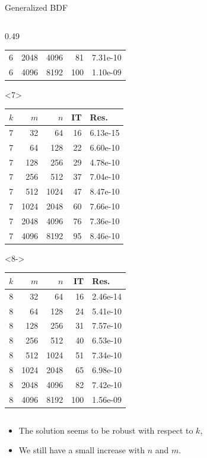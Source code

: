 \documentclass[aspectratio=169,xcolor=dvipsnames]{beamer}
\begin{document}
\begin{frame}[fragile]{Generalized BDF}
\begin{columns}
\begin{column}{0.49\columnwidth}
\begin{onlyenv}
\begin{tabular}{crrrl}
6 & 2048 & 4096 & 81 & 7.31e-10\\
6 & 4096 & 8192 & 100 & 1.10e-09\\
		\bottomrule
	\end{tabular}
\end{onlyenv}
\begin{onlyenv}<7>
	\begin{tabular}{crrrl}
		\toprule
		$k$ & $m$ & $n$ & IT & Res. \\
		\midrule
7 & 32 & 64 & 16 & 6.13e-15\\
7 & 64 & 128 & 22 & 6.60e-10\\
7 & 128 & 256 & 29 & 4.78e-10\\
7 & 256 & 512 & 37 & 7.04e-10\\
7 & 512 & 1024 & 47 & 8.47e-10\\
7 & 1024 & 2048 & 60 & 7.66e-10\\
7 & 2048 & 4096 & 76 & 7.36e-10\\
7 & 4096 & 8192 & 95 & 8.46e-10\\
		\bottomrule
	\end{tabular}
\end{onlyenv}
\begin{onlyenv}<8->
	\begin{tabular}{crrrl}
		\toprule
		$k$ & $m$ & $n$ & IT & Res. \\
		\midrule
8 & 32 & 64 & 16 & 2.46e-14\\
8 & 64 & 128 & 24 & 5.41e-10\\
8 & 128 & 256 & 31 & 7.57e-10\\
8 & 256 & 512 & 40 & 6.53e-10\\
8 & 512 & 1024 & 51 & 7.34e-10\\
8 & 1024 & 2048 & 65 & 6.98e-10\\
8 & 2048 & 4096 & 82 & 7.42e-10\\
8 & 4096 & 8192 & 100 & 1.56e-09\\
		\bottomrule
	\end{tabular}
\end{onlyenv}
\end{column}
\end{columns}
\vfill

\begin{itemize}
	\item[\faEye]<9-> The solution seems to be robust with respect to $k$,
	\item[\faEye]<10-> We still have a small increase with $n$ and $m$.
\end{itemize}
\end{frame}
\end{document}
